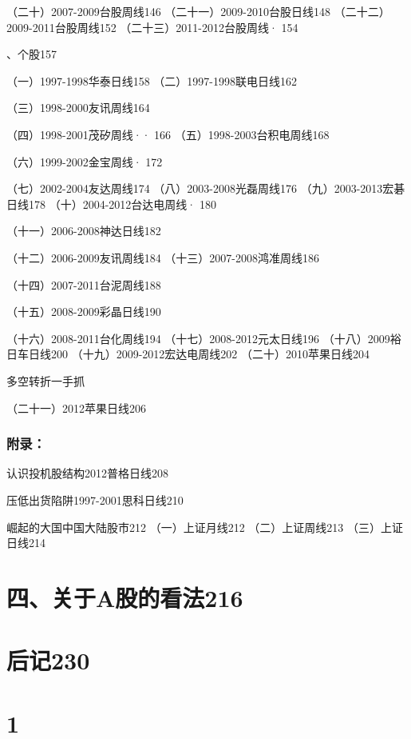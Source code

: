 \documentclass{article}
\begin{document}
\clearpage

（二十）2007-2009台股周线146 （二十一）2009-2010台股日线148 （二十二）2009-2011台股周线152 （二十三）2011-2012台股周线· 154

、个股157

（一）1997-1998华泰日线158 （二）1997-1998联电日线162

（三）1998-2000友讯周线164

（四）1998-2001茂矽周线·· 166 （五）1998-2003台积电周线168

（六）1999-2002金宝周线· 172

（七）2002-2004友达周线174 （八）2003-2008光磊周线176 （九）2003-2013宏碁日线178 （十）2004-2012台达电周线· 180

（十一）2006-2008神达日线182

（十二）2006-2009友讯周线184 （十三）2007-2008鸿准周线186

（十四）2007-2011台泥周线188

（十五）2008-2009彩晶日线190

（十六）2008-2011台化周线194 （十七）2008-2012元太日线196 （十八）2009裕日车日线200 （十九）2009-2012宏达电周线202 （二十）2010苹果日线204

\clearpage

多空转折一手抓

（二十一）2012苹果日线206

\subsubsection{附录：}

认识投机股结构2012普格日线208

压低出货陷阱1997-2001思科日线210

崛起的大国中国大陆股市212 （一）上证月线212 （二）上证周线213 （三）上证日线214

\section{四、关于A股的看法216}

\section{后记230}

\clearpage

\section{1}
\end{document}
